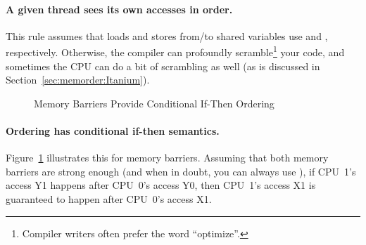 \paragraph{A given thread sees its own accesses in order.}
This rule assumes that loads and stores from/to shared variables use
 and , respectively.
Otherwise, the compiler can profoundly scramble\footnote{
	Compiler writers often prefer the word ``optimize''.}
your code, and sometimes the CPU can do a bit of scrambling as well
(as is discussed in Section~\ref{sec:memorder:Itanium}).

\begin{figure}[tb]
\centering
{}
\caption{Memory Barriers Provide Conditional If-Then Ordering}
\label{fig:memorder:Memory Barriers Provide Conditional If-Then Ordering}
\end{figure}

\paragraph{Ordering has conditional if-then semantics.}
Figure~\ref{fig:memorder:Memory Barriers Provide Conditional If-Then Ordering}
illustrates this for memory barriers.
Assuming that both memory barriers are strong enough (and when in doubt, you
can always use ), if CPU~1's access Y1 happens after CPU~0's
access Y0, then CPU~1's access X1 is guaranteed to happen after CPU~0's
access X1.

